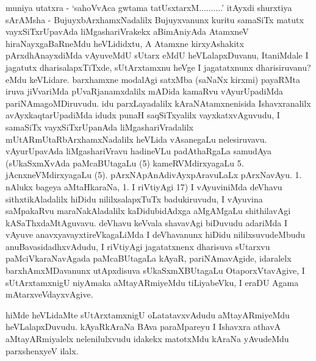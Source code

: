 \begin{artha}
muniya utatxra - `sahoVvAca gwtama tatUsxtarxM..........' itAyxdi shurxtiya sArAMsha - BujuyxbArxhamxNadalilx Bujuyxvanunx kuritu samaSiTx matutx vayxSiTxrUpavAda liMgashariVrakekx aBimAniyAda AtamxneV hiraNayxgaBaRneMdu heVLididxtu, A Atamxne kirxyAshakitx pArxdhAnayxdiMda vAyuveMdU sUtarx eMdU heVLalapxDuvanu, ItaniMdale I jagatutx dharisalapxTiTxde, sUtArxtamxnu heVge I jagatatxnunx dharisiruvanu? eMdu keVLidare. barxhamxne modalAgi satxMba (saNaNx kirxmi) payaRMta iruva jiVvariMda pUvaRjanamxdalilx mADida kamaRvu vAyurUpadiMda pariNAmagoMDiruvudu. idu parxLayadalilx kAraNAtamxnenisida Ishavxranalilx avAyxkaqtarUpadiMda idudx punaH saqSiTxyalilx vayxkatxvAguvudu, I samaSiTx vayxSiTxrUpanAda liMgashariVradalilx mUtARmUtaRbArxhamxNadalilx heVLida vAsanegaLu nelesiruvavu. vAyurUpavAda liMgashariVravu hadineVLu padAthaRgaLa samudAya (sUkaSxmXvAda paMcaBUtagaLu (5) kameRVMdirxyagaLu 5. jAcnxneVMdirxyagaLu (5). pArxNApAnAdivAyxpAravuLaLx pArxNavAyu. 1. nAlukx bageya aMtaHkaraNa, 1. I riVtiyAgi 17) I vAyuviniMda deVhavu sithxtikAladalilx hiDidu nililxsalapxTuTx badukiruvudu, I vAyuvina saMpakaRvu maraNakAladalilx kaDidubidAdxga aMgAMgaLu shithilavAgi kASaThxdaMtAguvavu. deVhavu keVvala shavavAgi biDuvudu adariMda I vAyuve anavxyavayxtireVkagaLiMda I deVhavanunx hiDidu nililxsuvudeMbudu anuBavasidadhxvAdudu, I riVtiyAgi jagatatxnenx dharisuva sUtarxvu paMciVkaraNavAgada paMcaBUtagaLa kAyaR, pariNAmavAgide, idaralelx barxhAmxMDavanunx utApxdisuva sUkaSxmXBUtagaLu OtaporxVtavAgive, I sUtArxtamxnigU niyAmaka aMtayARmiyeMdu tiLiyabeVku, I eraDU Agama mAtarxveVdayxvAgive.
\end{artha}


\begin{artha}
hiMde heVLidaMte sUtArxtamxnigU oLatatavxvAdudu aMtayARmiyeMdu heVLalapxDuvudu. kAyaRkAraNa BAva paraMpareyu I Ishavxra athavA aMtayARmiyalelx nelenilulxvudu idakekx matotxMdu kAraNa yAvudeMdu parxshenxyeV ilalx.
\end{artha}

